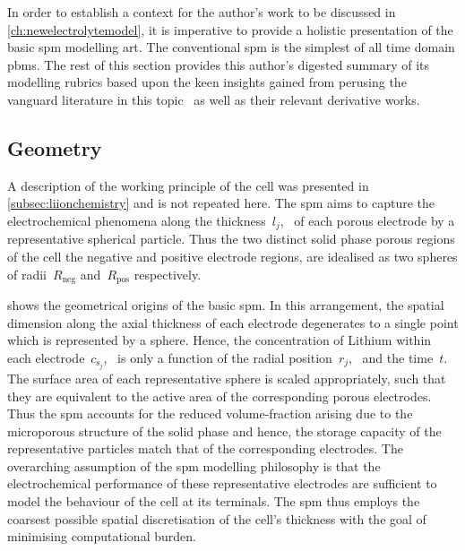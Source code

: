 
In  order  to  establish  a  context  for the  author's  work  to  be  discussed
in  \cref{ch:newelectrolytemodel},  it  is  imperative  to  provide  a  holistic
presentation of the basic \gls{spm} modelling art. The conventional \gls{spm} is
the  simplest  of  all  time  domain  \glspl{pbm}.  The  rest  of  this  section
provides  this author's  digested summary  of its  modelling rubrics  based upon
the  keen  insights  gained  from  perusing  the  vanguard  literature  in  this
topic~\cite{Santhanagopalan2006,Santhanagopalan2006a,DiDomenico2010} as  well as
their relevant derivative works.

\subsection{Geometry}\label{subsec:basicspmgeometry}

A  description  of   the  working  principle  of  the  cell   was  presented  in
\cref{subsec:liionchemistry} and  is not  repeated here.  The \gls{spm}  aims to
capture the electrochemical phenomena along the thickness~$l_j$,~\jinnegpos{} of
each  porous electrode  by a  representative  spherical particle.  Thus the  two
distinct  solid  phase porous  regions  of  the  cell \ie{} the  negative  and
positive electrode regions, are idealised as two spheres of radii~$R_\text{neg}$
and~$R_\text{pos}$ respectively.


   shows   the   geometrical  origins   of   the   basic
\gls{spm}.  In  this   arrangement,  the  spatial  dimension   along  the  axial
thickness  of   each  electrode   degenerates  to  a   single  point   which  is
represented  by  a sphere.  Hence,  the  concentration  of Lithium  within  each
electrode~$c_{\text{s}_j}$,~\jinnegpos{}  is  only  a  function  of  the  radial
position~$r_j$,~\jinnegpos{}  and  the  time~$t$.   The  surface  area  of  each
representative sphere is scaled appropriately,  such that they are equivalent to
the  active area  of the  corresponding  porous electrodes.  Thus the  \gls{spm}
accounts  for  the  reduced  volume-fraction  arising  due  to  the  microporous
structure  of  the   solid  phase  and  hence,  the  storage   capacity  of  the
representative  particles  match  that  of  the  corresponding  electrodes.  The
overarching  assumption  of  the  \gls{spm} modelling  philosophy  is  that  the
electrochemical performance of these representative electrodes are sufficient to
model the behaviour of the cell at its terminals. The \gls{spm} thus employs the
coarsest possible spatial  discretisation of the cell's thickness  with the goal
of minimising computational burden.

